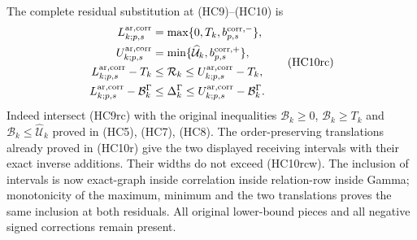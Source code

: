 The complete residual substitution at (HC9)--(HC10) is
\[
\begin{aligned}
 L_{k;p,s}^{\rm ar,corr}&=\max\{0,T_k,b_{p,s}^{\rm corr,-}\},\\
 U_{k;p,s}^{\rm ar,corr}&=\min\{\widehat{\mathcal U}_k,b_{p,s}^{\rm corr,+}\},\\
 L_{k;p,s}^{\rm ar,corr}-T_k
 &\leq\mathcal R_k\leq U_{k;p,s}^{\rm ar,corr}-T_k,\\
 L_{k;p,s}^{\rm ar,corr}-\mathcal B_k^\Gamma
 &\leq\Delta_k^\Gamma
                    \leq U_{k;p,s}^{\rm ar,corr}-\mathcal B_k^\Gamma.
\end{aligned}\tag{HC10rc}
\]
Indeed intersect (HC9rc) with the original inequalities
$\mathcal B_k\geq0$, $\mathcal B_k\geq T_k$ and
$\mathcal B_k\leq\widehat{\mathcal U}_k$ proved in (HC5),
(HC7), (HC8). The order-preserving translations already proved
in (HC10r) give the two displayed receiving intervals with their
exact inverse additions. Their widths do not exceed (HC10rcw).
The inclusion of intervals is now exact-graph inside correlation
inside relation-row inside Gamma; monotonicity of the maximum,
minimum and the two translations proves the same inclusion
at both residuals. All original lower-bound pieces and all
negative signed corrections remain present.

